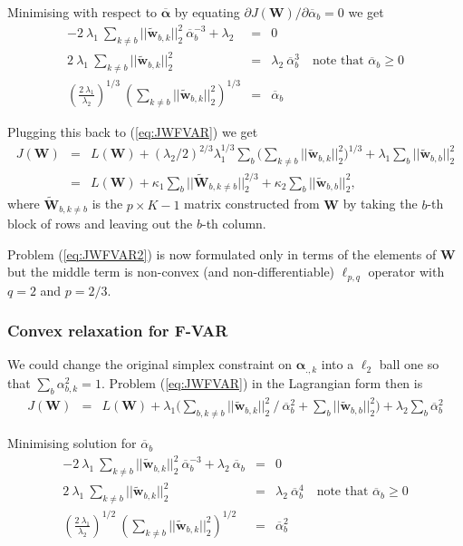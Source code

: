 \documentclass[a4paper]{article}
\newcommand{\vc}[1]{\mathbf{#1}}
\begin{document}
Minimising with respect to $\overline{\vc{\alpha}}$ by equating $\partial\mathit{J}(\vc{W}) / \partial\overline{\alpha}_{b} = 0$ we get
\begin{eqnarray}
-2 ~ \lambda_1 ~ \sum_{k \neq b} ||\tilde{\vc{w}}_{b,k}||_2^2 ~ \overline{\alpha}_{b}^{-3} + \lambda_2 & = & 0 \nonumber \\
2 ~ \lambda_1 ~ \sum_{k \neq b} ||\tilde{\vc{w}}_{b,k}||_2^2 & = & \lambda_2 ~ \overline{\alpha}_{b}^{3}  \quad \text{note that }  \overline{\alpha}_{b} \geq 0 \nonumber \\
(\frac{2 ~ \lambda_1}{\lambda_2})^{1/3} ~ (\sum_{k \neq b} ||\tilde{\vc{w}}_{b,k}||_2^2)^{1/3} & = & \overline{\alpha}_{b}
\end{eqnarray}

Plugging this back to (\ref{eq:JWFVAR}) we get
\begin{eqnarray}\label{eq:JWFVAR2}
\mathit{J}(\vc{W}) & = & \mathit{L}(\vc{W}) + (\lambda_2/2)^{2/3} \lambda_1^{1/3} \sum_b \Big( \sum_{k \neq b} ||\tilde{\vc{w}}_{b,k}||_2^2 \Big)^{1/3} + \lambda_1 \sum_b ||\tilde{\vc{w}}_{b,b}||_2^2 \nonumber \\
& = & \mathit{L}(\vc{W}) + \kappa_1 \sum_b ||\tilde{\vc{W}}_{b,k \neq b}||_2^{2/3}  + \kappa_2 \sum_b ||\tilde{\vc{w}}_{b,b}||_2^2,
\end{eqnarray}
where $\tilde{\vc{W}}_{b,k \neq b}$ is the $p \times K-1$ matrix constructed from $\vc{W}$ by taking the $b$-th block of rows and leaving out the $b$-th column.

Problem (\ref{eq:JWFVAR2}) is now formulated only in terms of the elements of $\vc{W}$ but the middle term is non-convex (and non-differentiable) $\ell_{p,q}$ operator with $q=2$ and $p=2/3$.

\subsubsection{Convex relaxation for F-VAR}
We could change the original simplex constraint on $\vc{\alpha}_{.,k}$ into a $\ell_2$ ball one so that $\sum_b \alpha_{b,k}^2 = 1$.
Problem (\ref{eq:JWFVAR}) in the Lagrangian form then is
\begin{eqnarray}\label{eq:JWFVAR3}
\mathit{J}(\vc{W}) & = & \mathit{L}(\vc{W}) + \lambda_1 \Big( \sum_{b,k \neq b} ||\tilde{\vc{w}}_{b,k}||_2^2 ~/~ \overline{\alpha}_{b}^2 + \sum_b ||\tilde{\vc{w}}_{b,b}||_2^2 \Big) + \lambda_2 \sum_b \overline{\alpha}_{b}^2 \end{eqnarray}

Minimising solution for $\overline{\alpha}_{b}$ 
\begin{eqnarray}
-2 ~ \lambda_1 ~ \sum_{k \neq b} ||\tilde{\vc{w}}_{b,k}||_2^2 ~ \overline{\alpha}_{b}^{-3} + \lambda_2 ~ \overline{\alpha}_{b} & = & 0 \nonumber \\
2 ~ \lambda_1 ~ \sum_{k \neq b} ||\tilde{\vc{w}}_{b,k}||_2^2 & = & \lambda_2 ~ \overline{\alpha}_{b}^{4}  \quad \text{note that }  \overline{\alpha}_{b} \geq 0 \nonumber \\
(\frac{2 ~ \lambda_1}{\lambda_2})^{1/2} ~ (\sum_{k \neq b} ||\tilde{\vc{w}}_{b,k}||_2^2)^{1/2} & = & \overline{\alpha}_{b}^2
\end{eqnarray}
\end{document}
